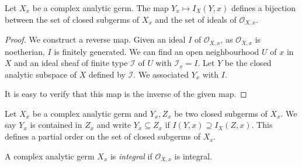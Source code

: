 \begin{proposition}\label{prop-bijsubgermideal}
    Let $X_x$ be a complex analytic germ.
    The map $Y_x\mapsto I_X(Y,x)$ defines a bijection between the set of closed subgerms of $X_x$ and the set of ideals of $\mathcal{O}_{X,x}$.
\end{proposition}
\begin{proof}
    We construct a reverse map. Given an ideal $I$ of $\mathcal{O}_{X,x}$, as $\mathcal{O}_{X,x}$ is noetherian, $I$ is finitely generated. We can find an open neighbourhood $U$ of $x$ in $X$ and an ideal sheaf of finite type $\mathcal{I}$ of $U$ with $\mathcal{I}_x=I$. Let $Y$ be the closed analytic subspace of $X$ defined by $\mathcal{I}$. We associated $Y_x$ with $I$. 
    
    It is easy to verify that this map is the inverse of the given map.
\end{proof}

\begin{definition}
    Let $X_x$ be a complex analytic germ and $Y_x, Z_x$ be two closed subgerms of $X_x$. We say $Y_x$ is contained in $Z_x$ and write
    $Y_x\subseteq Z_x$ if $I(Y,x)\supseteq I_X(Z,x)$. This defines a partial order on the set of closed subgerms of $X_x$.
\end{definition}

\begin{definition}
    A complex analytic germ $X_x$ is \emph{integral} if $\mathcal{O}_{X,x}$ is integral.
\end{definition}

